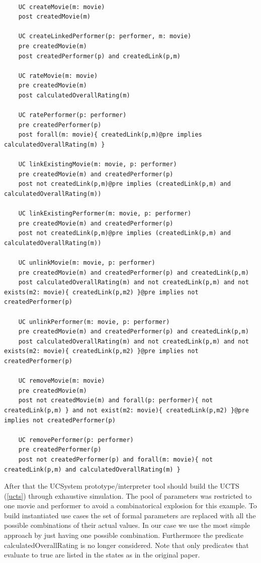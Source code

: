 \begin{lstlisting}[caption={Contracts attached to use cases},label={contracts1}]
	
	UC createMovie(m: movie)
	post createdMovie(m)
	
	UC createLinkedPerformer(p: performer, m: movie)
	pre createdMovie(m)
	post createdPerformer(p) and createdLink(p,m)
	
	UC rateMovie(m: movie)
	pre createdMovie(m)
	post calculatedOverallRating(m)
	
	UC ratePerformer(p: performer)
	pre createdPerformer(p)
	post forall(m: movie){ createdLink(p,m)@pre implies calculatedOverallRating(m) }
	
	UC linkExistingMovie(m: movie, p: performer)
	pre createdMovie(m) and createdPerformer(p)
	post not createdLink(p,m)@pre implies (createdLink(p,m) and calculatedOverallRating(m))
	
	UC linkExistingPerformer(m: movie, p: performer)
	pre createdMovie(m) and createdPerformer(p)
	post not createdLink(p,m)@pre implies (createdLink(p,m) and calculatedOverallRating(m))
	
	UC unlinkMovie(m: movie, p: performer)
	pre createdMovie(m) and createdPerformer(p) and createdLink(p,m)
	post calculatedOverallRating(m) and not createdLink(p,m) and not exists(m2: movie){ createdLink(p,m2) }@pre implies not createdPerformer(p)
	
	UC unlinkPerformer(m: movie, p: performer)
	pre createdMovie(m) and createdPerformer(p) and createdLink(p,m)
	post calculatedOverallRating(m) and not createdLink(p,m) and not exists(m2: movie){ createdLink(p,m2) }@pre implies not createdPerformer(p)
	
	UC removeMovie(m: movie)
	pre createdMovie(m)
	post not createdMovie(m) and forall(p: performer){ not createdLink(p,m) } and not exist(m2: movie){ createdLink(p,m2) }@pre implies not createdPerformer(p)
	
	UC removePerformer(p: performer)
	pre createdPerformer(p)
	post not createdPerformer(p) and forall(m: movie){ not createdLink(p,m) and calculatedOverallRating(m) }
\end{lstlisting}

After that the UCSystem prototype/interpreter tool should build the UCTS (\autoref{ucts}) through exhaustive simulation. The pool of parameters was restricted to one movie and performer to avoid a combinatorical explosion for this example. To build instantiated use cases the set of formal parameters are replaced with all the possible combinations of their actual values. In our case we use the most simple approach by just having one possible combination. Furthermore the predicate calculatedOverallRating is no longer considered. Note that only predicates that evaluate to true are listed in the states as in the original paper. 

